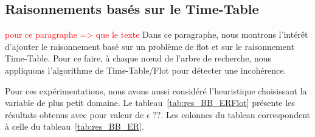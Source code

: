 \subsection{Raisonnements basés sur le Time-Table}
\label{sec:expe_TT}

\textcolor{red}{\LARGE pour ce paragraphe => que le texte}
Dans ce paragraphe, nous montrons l'intérêt d'ajouter le
raisonnement basé sur un problème de flot et sur le raisonnement
Time-Table. Pour ce faire, à chaque n\oe ud de l'arbre de recherche,
nous appliquons l'algorithme de Time-Table/Flot pour détecter une
incohérence. 

Pour ces expérimentations, nous avons aussi considéré l'heuristique
choisissant la variable de plus petit domaine. Le
tableau~\ref{tab:res_BB_ERFlot} présente les résultats obtenus avec
pour valeur de $\epsilon$ $??$. Les colonnes du tableau correspondent
à celle du tableau~\ref{tab:res_BB_ER}.

